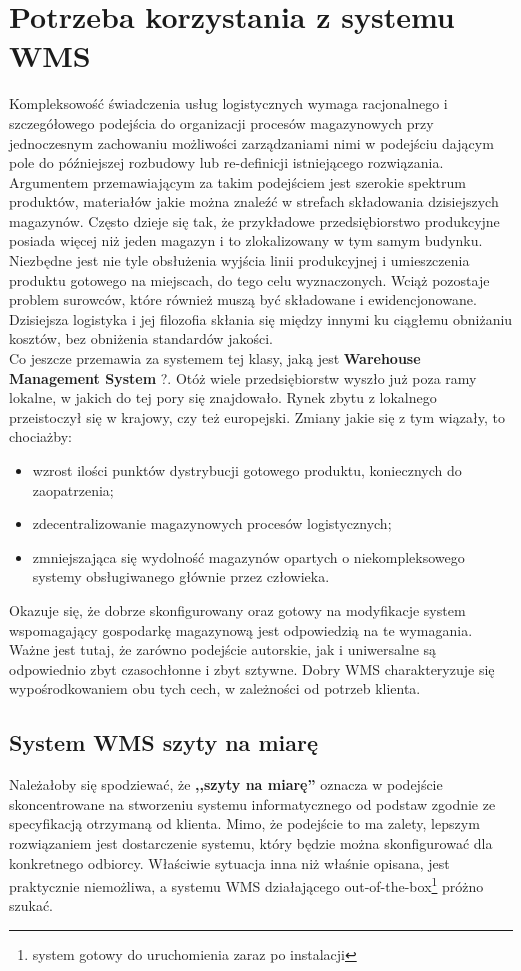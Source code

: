 \section{Potrzeba korzystania z systemu WMS}
	Kompleksowość świadczenia usług logistycznych wymaga racjonalnego i szczegółowego podejścia
	do organizacji procesów magazynowych przy jednoczesnym zachowaniu możliwości zarządzaniami
	nimi w podejściu dającym pole do późniejszej rozbudowy lub re-defini\-cji istniejącego
	rozwiązania. Argumentem przemawiającym za takim podejściem jest szerokie spektrum 
	produktów, materiałów jakie można znaleźć w strefach składowania dzisiej\-szych magazynów.
	Często dzieje się tak, że przykładowe przedsiębiorstwo produkcyjne posiada więcej niż jeden
	magazyn i to zlokalizowany w tym samym budynku. Niezbędne jest nie tyle obsłużenia
	wyjścia linii produkcyjnej i umieszczenia produktu gotowego na miejscach, do tego celu wyznaczonych.
	Wciąż pozostaje problem surowców, które również muszą być składowane i ewidencjonowane. Dzisiejsza
	logistyka i jej filozofia skłania się między innymi ku ciągłemu obniżaniu kosztów, bez obniżenia
	standardów jakości. \\
	
	Co jeszcze przemawia za systemem tej klasy, jaką jest \textbf{Warehouse Management System} ?. Otóż 
	wiele przedsiębiorstw wyszło już poza ramy lokalne, w jakich do tej pory się znajdowało. Rynek zbytu
	z lokalnego przeistoczył się w krajowy, czy też europejski. Zmiany jakie się z tym wiązały, to chociażby:
	\begin{itemize}
		\item wzrost ilości punktów dystrybucji gotowego produktu, koniecznych do zaopatrzenia;
		\item zdecentralizowanie magazynowych procesów logistycznych;
		\item zmniejszająca się wydolność magazynów opartych o niekompleksowego systemy
		obsługiwanego głównie przez człowieka.
	\end{itemize}
	Okazuje się, że dobrze skonfigurowany oraz gotowy na modyfikacje system wspomagający gospodarkę magazynową
	jest odpowiedzią na te wymagania. Ważne jest tutaj, że zarówno podejście autorskie, jak i uniwersalne są
	odpowiednio zbyt czasochłonne i zbyt sztywne. Dobry WMS charakteryzuje się wypośrodkowaniem obu tych 
	cech, w zależności od potrzeb klienta. \\
	
	\subsection{System WMS szyty na miarę}
	Należałoby się spodziewać, że \textbf{,,szyty na miarę''} oznacza w podejście skoncentrowane
	na stworzeniu systemu informatycznego od podstaw zgodnie ze specyfikacją otrzymaną od klienta.
	Mimo, że podejście to ma zalety, lepszym rozwiązaniem jest dostarczenie systemu, który 
	będzie można skonfigurować dla konkretnego odbiorcy. Właściwie sytuacja inna niż właśnie opisana,
	jest praktycznie niemożliwa, a systemu WMS działającego out-of-the-box\footnote{system gotowy do
	uruchomienia zaraz po instalacji} próżno szukać.\\
		
